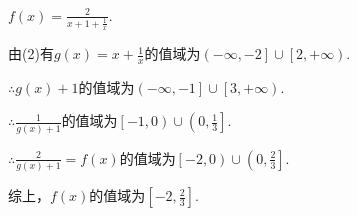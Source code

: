 \documentclass[8pt]{article}
\begin{document}
\begin{enumerate}[(1)]
\begin{enumerate}[$1^\circ$]
					$f(x)=\frac{2}{x+1+\frac{1}{x}}.$

					由(2)有$g(x)=x+\frac{1}{x}$的值域为$\left(-\infty,-2\right]\cup\left[2,+\infty\right).$

					$\therefore g(x)+1$的值域为$\left(-\infty,-1\right]\cup\left[3,+\infty\right).$

					$\therefore \frac{1}{g(x)+1}$的值域为$\left[-1,0\right)\cup\left(0,\frac{1}{3}\right].$

					$\therefore \frac{2}{g(x)+1}=f(x)$的值域为$\left[-2,0\right)\cup\left(0,\frac{2}{3}\right].$

			\end{enumerate}

			综上，$f(x)$的值域为$\left[-2,\frac{2}{3}\right].$

	\end{enumerate}
\end{document}
